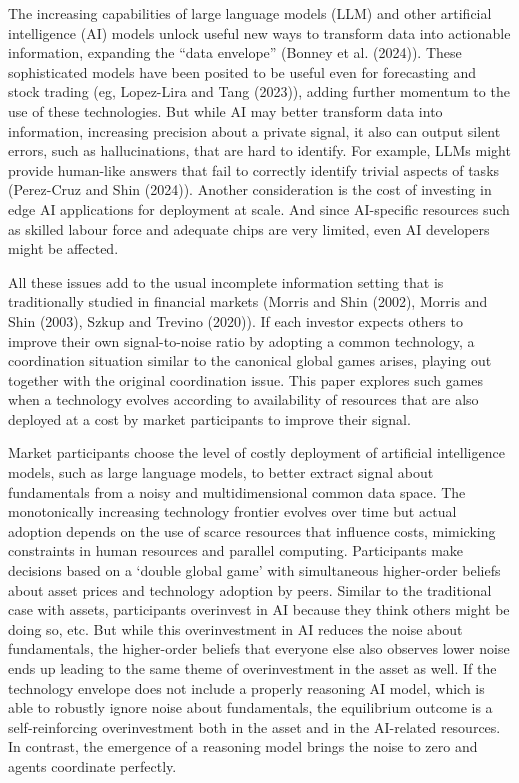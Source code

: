 \documentclass[
]{article}
\theoremstyle{plain}
\theoremstyle{remark}
\begin{document}
The increasing capabilities of large language models (LLM) and other
artificial intelligence (AI) models unlock useful new ways to transform
data into actionable information, expanding the ``data envelope''
(Bonney et al. (2024)). These sophisticated models have been posited to
be useful even for forecasting and stock trading (eg, Lopez-Lira and
Tang (2023)), adding further momentum to the use of these technologies.
But while AI may better transform data into information, increasing
precision about a private signal, it also can output silent errors, such
as hallucinations, that are hard to identify. For example, LLMs might
provide human-like answers that fail to correctly identify trivial
aspects of tasks (Perez-Cruz and Shin (2024)). Another consideration is
the cost of investing in edge AI applications for deployment at scale.
And since AI-specific resources such as skilled labour force and
adequate chips are very limited, even AI developers might be affected.

All these issues add to the usual incomplete information setting that is
traditionally studied in financial markets (Morris and Shin (2002),
Morris and Shin (2003), Szkup and Trevino (2020)). If each investor
expects others to improve their own signal-to-noise ratio by adopting a
common technology, a coordination situation similar to the canonical
global games arises, playing out together with the original coordination
issue. This paper explores such games when a technology evolves
according to availability of resources that are also deployed at a cost
by market participants to improve their signal.

Market participants choose the level of costly deployment of artificial
intelligence models, such as large language models, to better extract
signal about fundamentals from a noisy and multidimensional common data
space. The monotonically increasing technology frontier evolves over
time but actual adoption depends on the use of scarce resources that
influence costs, mimicking constraints in human resources and parallel
computing. Participants make decisions based on a `double global game'
with simultaneous higher-order beliefs about asset prices and technology
adoption by peers. Similar to the traditional case with assets,
participants overinvest in AI because they think others might be doing
so, etc. But while this overinvestment in AI reduces the noise about
fundamentals, the higher-order beliefs that everyone else also observes
lower noise ends up leading to the same theme of overinvestment in the
asset as well. If the technology envelope does not include a properly
reasoning AI model, which is able to robustly ignore noise about
fundamentals, the equilibrium outcome is a self-reinforcing
overinvestment both in the asset and in the AI-related resources. In
contrast, the emergence of a reasoning model brings the noise to zero
and agents coordinate perfectly.
\end{document}
